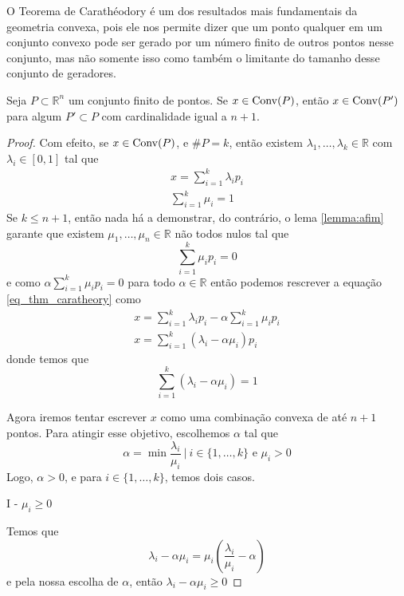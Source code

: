 O Teorema de Carathéodory é um dos resultados mais fundamentais da geometria
convexa, pois ele nos permite dizer que um ponto qualquer em um conjunto
convexo pode ser gerado por um número finito de outros pontos nesse conjunto,
mas não somente isso como também o limitante do tamanho desse conjunto de
geradores.

\begin{thm:caratheodory}[Carathéodory]
	Seja $P \subset \mathbb{R}^n$ um conjunto finito de pontos. Se $x \in \mathrm{Conv}(P)$, então
	$x \in \mathrm{Conv}(P')$ para algum $P' \subset P$ com cardinalidade igual a $n + 1$.

	\begin{proof}
		Com efeito, se $x \in \mathrm{Conv}(P)$, e $\#P = k$, então existem $\lambda_1, \ldots, \lambda_k
		\in \mathbb{R}$ com $\lambda_i \in [0, 1]$ tal que
		\begin{equation}
		\label{eq_thm_caratheory}
		\begin{gathered}
			x = \displaystyle\sum_{i=1}^k \lambda_i p_i \\
			\displaystyle\sum_{i=1}^k \mu_i = 1
		\end{gathered}
		\end{equation}
		Se $k \leq n + 1$, então nada há a demonstrar, do contrário, o lema \ref{lemma:afim}
		garante que existem $\mu_1, \ldots, \mu_n \in \mathbb{R}$ não todos nulos tal que
		\[\displaystyle\sum_{i=1}^k \mu_i p_i = 0\]
		e como \(\alpha \displaystyle\sum_{i=1}^k \mu_i p_i = 0\) para todo $\alpha \in \mathbb{R}$
		então podemos rescrever a equação \ref{eq_thm_caratheory} como
		\begin{gather*}
			x = \displaystyle\sum_{i=1}^k \lambda_i p_i - \alpha \displaystyle\sum_{i=1}^k \mu_i p_i \\
			x = \displaystyle\sum_{i=1}^k (\lambda_i - \alpha \mu_i) p_i
		\end{gather*}
		donde temos que
		\[\displaystyle\sum_{i=1}^k (\lambda_i - \alpha \mu_i) = 1\]

		Agora iremos tentar escrever $x$ como uma combinação convexa de até $n + 1$ pontos.
		Para atingir esse objetivo, escolhemos $\alpha$ tal que
	\[\alpha  = \min{\frac{\lambda_i}{\mu_i}\  |\  i \in \{1,\ldots, k\} \text{ e } \mu_i > 0}\]
		Logo, $\alpha > 0$, e para $i \in \{1, \ldots, k\}$, temos dois casos.

		I - $\mu_i \geq 0$

		Temos que
		\[\lambda_i - \alpha \mu_i = \mu_i \left(\frac{\lambda_i}{\mu_i} - \alpha\right)\]
		e pela nossa escolha de $\alpha$, então \(\lambda_i - \alpha \mu_i \geq 0\)


\end{proof}
\end{thm:caratheodory}
